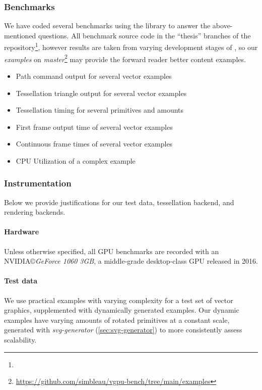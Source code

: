 \subsubsection{Benchmarks}\label{sec:benchmarks}
We have coded several benchmarks using the \toollinkedname library to answer the above-mentioned questions. All benchmark source code in the ``thesis'' branches of the \toollinkedname repository\footnote{\toolrepo}, however results are taken from varying development stages of \toollinkedname, so our \textit{examples} on \textit{master}\footnote{\href{https://github.com/simbleau/vgpu-bench/tree/main/examples}{https://github.com/simbleau/vgpu-bench/tree/main/examples}} may provide the forward reader better content examples.

\begin{itemize}
    \item Path command output for several vector examples
    \item Tessellation triangle output for several vector examples
    \item Tessellation timing for several primitives and amounts
    \item First frame output time of several vector examples
    \item Continuous frame times of several vector examples
    \item CPU Utilization of a complex example
\end{itemize}

\subsubsection{Instrumentation}
Below we provide justifications for our test data, tessellation backend, and rendering backends.

\paragraph{Hardware}
Unless otherwise specified, all GPU benchmarks are recorded with an NVIDIA\copyright \textit{GeForce 1060 3GB}, a middle-grade desktop-class GPU released in 2016.\medskip

\paragraph{Test data}
We use practical examples with varying complexity for a test set of vector graphics, supplemented with dynamically generated examples. Our dynamic examples have varying amounts of rotated primitives at a constant scale, generated with \textit{svg-generator} (\cref{sec:svg-generator}) to more consistently assess scalability.\medskip

